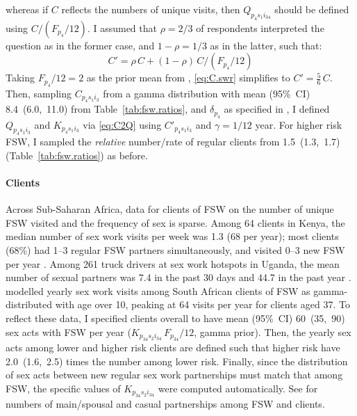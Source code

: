 whereas if $C$ reflects the numbers of unique visits, then
$Q_{p_{4}s_{1}i_{34}}$ should be defined using $C/(F_{p_{4}}/12)$.
I assumed that $\rho = 2/3$ of respondents interpreted the question as in the former case,
and $1-\rho = 1/3$ as in the latter, such that:
\begin{equation}\label{eq:C.swr}
  C' = \rho\,C + (1-\rho)\,C/(F_{p_{4}}/12)
\end{equation}
Taking $F_{p_{4}}/12 = 2$ as the prior mean from ,
\eqref{eq:C.swr} simplifies to $C' = \frac{5}{6}\,C$.
Then, sampling $C_{p_{4}s_{1}i_{3}}$
from a gamma distribution with mean (95\%~CI) 8.4~(6.0,~11.0) from Table~\ref{tab:fsw.ratios},
and $\delta_{p_{4}}$ as specified in ,
I defined $Q_{p_{4}s_{1}i_{3}}$ and $K_{p_{4}s_{1}i_{3}}$
via \eqref{eq:C2Q} using $C'_{p_{4}s_{1}i_{3}}$ and $\gamma = 1/12$ year.
For higher risk FSW, I sampled the \emph{relative} number/rate of regular clients from
1.5~(1.3,~1.7) (Table~\ref{tab:fsw.ratios}) as before.
\paragraph{Clients}
Across Sub-Saharan Africa, data for clients of FSW on
the number of unique FSW visited and the frequency of sex is sparse.
Among 64 clients in Kenya,
the median number of sex work visits per week was 1.3 (68 per year);
most clients (68\%) had 1--3 regular FSW partners simultaneously, and
visited 0--3 new FSW per year \cite{Voeten2002}.
Among 261 truck drivers at sex work hotspots in Uganda,
the mean number of sexual partners was
7.4 in the past 30 days and 44.7 in the past year \cite{Matovu2012}.
\citet{Johnson2017} modelled yearly sex work visits among South African clients of FSW as
gamma-distributed with age over 10, peaking at 64 visits per year for clients aged 37.
To reflect these data, I specified clients overall to have
mean (95\%~CI) 60~(35,~90) sex acts with FSW per year
($K_{p_{34}s_{2}i_{34}}\,F_{p_{34}}/12$, gamma prior).
Then, the yearly sex acts among lower and higher risk clients are defined such that
higher risk have 2.0~(1.6,~2.5) times the number among lower risk.
Finally, since the distribution of sex acts between new \vs regular sex work partnerships
must match that among FSW, the specific values of $K_{p_{34}s_{2}i_{34}}$
were computed automatically.
See  for numbers of main/spousal and casual partnerships
among FSW and clients.
